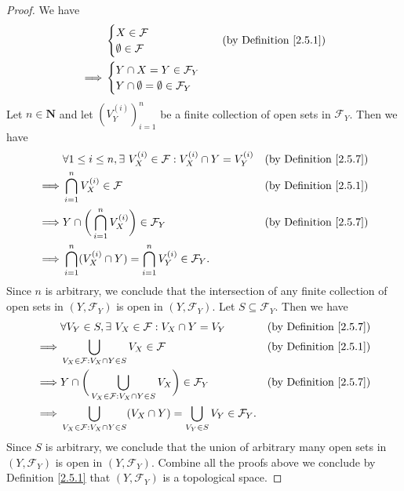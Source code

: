 \begin{proof}
    We have
    \begin{align*}
                 & \begin{cases}
                       X \in \mathcal{F} \\
                       \emptyset \in \mathcal{F}
                   \end{cases}                      & \text{(by Definition \ref{2.5.1})} \\
        \implies & \begin{cases}
                       Y \cap X = Y \in \mathcal{F}_Y \\
                       Y \cap \emptyset = \emptyset \in \mathcal{F}_Y
                   \end{cases}
    \end{align*}
    Let \(n \in \mathbf{N}\) and let \((V_Y^{(i)})_{i = 1}^n\) be a finite collection of open sets in \(\mathcal{F}_Y\).
    Then we have
    \begin{align*}
                 & \forall 1 \leq i \leq n, \exists\ V_X^{(i)} \in \mathcal{F} : V_X^{(i)} \cap Y = V_Y^{(i)} & \text{(by Definition \ref{2.5.7})} \\
        \implies & \bigcap_{i = 1}^n V_X^{(i)} \in \mathcal{F}                                                & \text{(by Definition \ref{2.5.1})} \\
        \implies & Y \cap \bigg(\bigcap_{i = 1}^n V_X^{(i)}\bigg) \in \mathcal{F}_Y                           & \text{(by Definition \ref{2.5.7})} \\
        \implies & \bigcap_{i = 1}^n (V_X^{(i)} \cap Y) = \bigcap_{i = 1}^n V_Y^{(i)} \in \mathcal{F}_Y.
    \end{align*}
    Since \(n\) is arbitrary, we conclude that the intersection of any finite collection of open sets in \((Y, \mathcal{F}_Y)\) is open in \((Y, \mathcal{F}_Y)\).
    Let \(S \subseteq \mathcal{F}_Y\).
    Then we have
    \begin{align*}
                 & \forall V_Y \in S, \exists\ V_X \in \mathcal{F} : V_X \cap Y = V_Y                                         & \text{(by Definition \ref{2.5.7})} \\
        \implies & \bigcup_{V_X \in \mathcal{F} : V_X \cap Y \in S} V_X \in \mathcal{F}                                       & \text{(by Definition \ref{2.5.1})} \\
        \implies & Y \cap \bigg(\bigcup_{V_X \in \mathcal{F} : V_X \cap Y \in S} V_X\bigg) \in \mathcal{F}_Y                  & \text{(by Definition \ref{2.5.7})} \\
        \implies & \bigcup_{V_X \in \mathcal{F} : V_X \cap Y \in S} (V_X \cap Y) = \bigcup_{V_Y \in S} V_Y \in \mathcal{F}_Y.
    \end{align*}
    Since \(S\) is arbitrary, we conclude that the union of arbitrary many open sets in \((Y, \mathcal{F}_Y)\) is open in \((Y, \mathcal{F}_Y)\).
    Combine all the proofs above we conclude by Definition \ref{2.5.1} that \((Y, \mathcal{F}_Y)\) is a topological space.
\end{proof}

